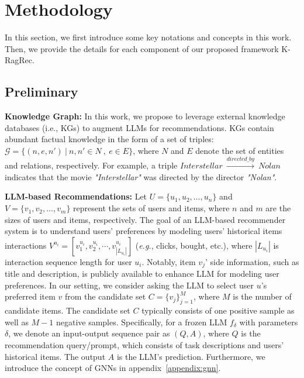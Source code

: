 \section{Methodology}
In this section, we first introduce some key notations and concepts in this work.
Then, we provide the details for each component of our proposed framework K-RagRec.

\subsection{Preliminary}


\textbf{Knowledge Graph:}
In this work, we propose to leverage external knowledge databases (i.e., KGs) to augment LLMs for recommendations.
KGs contain abundant factual knowledge in the form of a set of triples: $\mathcal{G}=\{(n,e,n') \ | \ n,n' \in N \ , \ e \in E\}$, where $N$ and $E$ denote the set of entities and relations, respectively. For example, a triple $Interstellar \ \xrightarrow{directed\_by} \ Nolan$ indicates that the movie \textit{"Interstellar"} was directed by the director \textit{"Nolan"}.

\noindent \textbf{LLM-based Recommendations:}
Let $U=\{u_1,u_2,\dots,u_n\}$ and $V=\{v_1,v_2,\dots,v_m\}$ represent the sets of users and items, where $n$ and $m$ are the sizes of users and items, respectively. 
The goal of an LLM-based recommender system is to understand users' preferences by modeling users' historical items interactions $V^{u_i}=[v^{u_i}_1, v^{u_i}_2, \cdots,v^{u_i}_{|L_{u_i}|} ]$ (\textit{e.g.}, clicks, bought, etc.), where $|L_{u_i}|$ is interaction sequence length for user $u_i$.  
Notably,  item $v_j$' side information, such as title and description, is publicly available to enhance LLM for modeling user preferences.  
In our setting, we consider asking the LLM to select user $u$'s preferred item $v$ from the candidate set $C = \{v_j\}^M_{j=1}$, where $M$ is the number of candidate items. The candidate set $C$ typically consists of one positive sample as well as $M-1$ negative samples.
Specifically, for a frozen LLM $f_{\delta}$ with parameters $\delta$, we denote an input-output sequence pair as $(Q, A)$, where $Q$ is the recommendation query/prompt, which consists of task descriptions and users' historical items. The output $A$ is the LLM's prediction. Furthermore, we introduce the concept of GNNs in appendix~\ref{appendix:gnn}.



